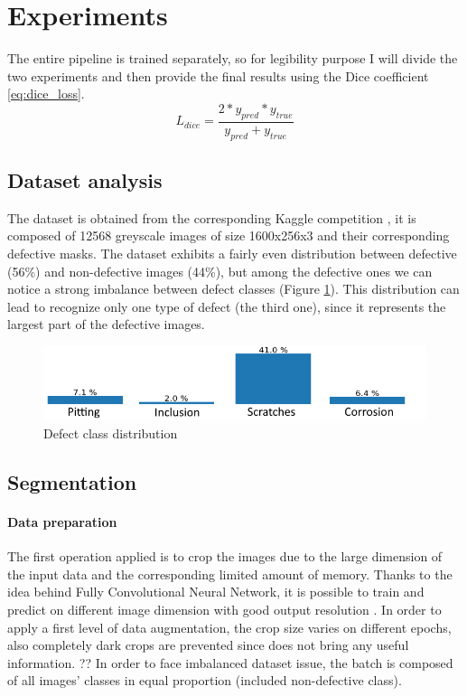 \documentclass[10pt,twocolumn,letterpaper]{article}
\begin{document}
\section{Experiments}
   The entire pipeline is trained separately, so for legibility purpose I will divide the two experiments and then provide the final results using the Dice coefficient \eqref{eq:dice_loss}.
   \begin{equation}\label{eq:dice_loss}
      L_{dice} = \frac{2 * y_{pred} * y_{true}}{y_{pred} + y_{true}}
   \end{equation}

   \subsection{Dataset analysis}
   The dataset is obtained from the corresponding Kaggle competition \cite{Severstal}, it is composed of 12568 greyscale images of size 1600x256x3 and their corresponding defective masks.
   The dataset exhibits a fairly even distribution between defective (56\%) and non-defective images (44\%), but among the defective ones we can notice a strong imbalance between defect classes (Figure \ref{fig:classImbalance}). This distribution can lead to recognize only one type of defect (the third one), since it represents the largest part of the defective images.
   \begin{figure}[h]
      \centering
      \caption{Defect class distribution} \label{fig:classImbalance}
      \includegraphics[scale=0.45]{Img_ClassImbalance}
   \end{figure}

   \subsection{Segmentation}
      \paragraph{Data preparation}
         The first operation applied is to crop the images due to the large dimension of the input data and the corresponding limited amount of memory. Thanks to the idea behind Fully Convolutional Neural Network, it is possible to train and predict on different image dimension with good output resolution \cite{FCNN}.
         In order to apply a first level of data augmentation, the crop size varies on different epochs, also completely dark crops are prevented since does not bring any useful information. ??
         In order to face imbalanced dataset issue, the batch is composed of all images' classes in equal proportion (included non-defective class).
\end{document}
